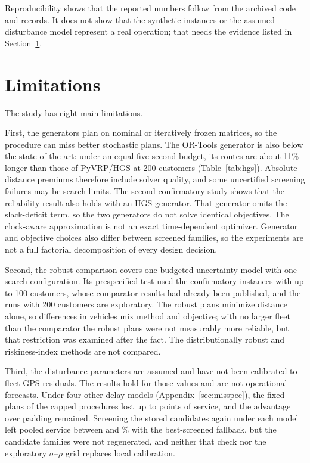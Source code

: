 \documentclass[11pt,a4paper]{article}
\begin{document}
Reproducibility shows that the reported numbers follow from the archived code and
records. It does not show that the synthetic instances or the assumed disturbance
model represent a real operation; that needs the evidence listed in
Section~\ref{sec:limitations}.

\section{Limitations}\label{sec:limitations}

The study has eight main limitations.

First, the generators plan on nominal or iteratively frozen matrices, so the
procedure can miss better stochastic plans. The OR-Tools generator is also below
the state of the art: under an equal five-second budget, its routes are about
11\% longer than those of PyVRP/HGS at 200 customers (Table~\ref{tab:hgs}).
Absolute distance premiums therefore include solver quality, and some uncertified
screening failures may be search limits. The second confirmatory study shows that
the reliability result also holds with an HGS generator. That generator omits
the slack-deficit term, so the two generators do not solve identical objectives.
The clock-aware approximation is not an exact time-dependent optimizer. Generator
and objective choices also differ between screened families, so the experiments
are not a full factorial decomposition of every design decision.

Second, the robust comparison covers one budgeted-uncertainty model with one
search configuration. Its prespecified test used the confirmatory instances with
up to 100 customers, whose comparator results had already been published, and
the runs with 200 customers are exploratory. The robust plans minimize distance
alone, so differences in vehicles mix method and objective; with no larger fleet
than the comparator the robust plans were not measurably more reliable, but that
restriction was examined after the fact. The distributionally robust and
riskiness-index methods \cite{jaillet2016,zhang2019} are not compared.

Third, the disturbance parameters are assumed and have not been calibrated to
fleet GPS residuals. The results hold for those values and are not operational
forecasts. Under four other delay models (Appendix~\ref{sec:misspec}), the fixed
plans of the capped procedures lost up to \MisCappedDrop{} points of service,
and the advantage over padding remained. Screening the stored candidates again
under each model left pooled service between \ResLoOrt{} and \ResHiHgs\% with the
best-screened fallback, but the candidate families were not regenerated, and
neither that check nor the exploratory $\sigma$--$\rho$ grid replaces local
calibration.
\end{document}
